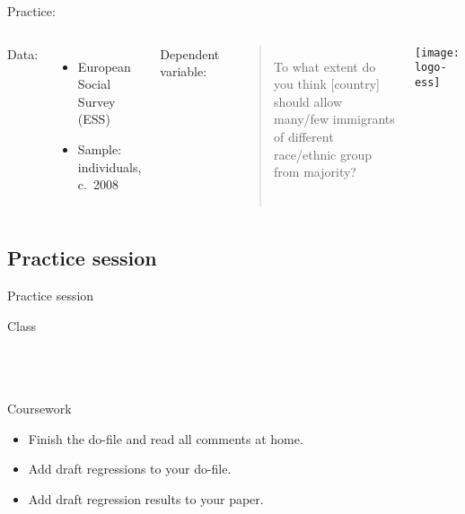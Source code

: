 \documentclass[t]{beamer}
\begin{document}
	\begin{frame}[t]{Practice: }

		\begin{columns}[c]

	    Data:\\[.5em]

			\begin{itemize}
				\item European Social Survey (ESS)
				\item Sample: individuals, c.~2008
			\end{itemize}
		
			\vspace{.75em}
		
	    Dependent variable:\\[.5em]
		
			\begin{quote}
			  To what extent do you think [country] should allow %
				many/few immigrants of different race/ethnic group %
				from majority?				
			\end{quote}
	

			\texttt{[image: logo-ess]}

		\end{columns}
	
	\end{frame}
	
	\subsection{Practice session}
  
	\begin{frame}[t]{Practice session}

    \begin{block}{Class}
      \\
      \\
      
			\\
			\\    
    \end{block}

    \begin{alertblock}{Coursework}
      \begin{itemize}
	      \item Finish the do-file and read all comments at home.
	      \item Add draft regressions to your do-file.
	      \item Add draft regression results to your paper.
      \end{itemize}
    \end{alertblock}
    		
	\end{frame}
	
\end{document}
